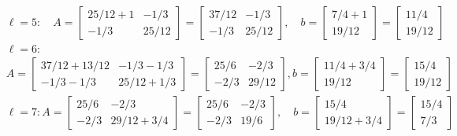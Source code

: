 \documentclass[../main.tex]{subfiles}
\begin{document}
$$
\begin{aligned}
&\ell=5: \quad A=\left[\begin{array}{cc}
25 / 12+1 & -1 / 3 \\
-1 / 3 & 25 / 12
\end{array}\right]=\left[\begin{array}{cc}
37 / 12 & -1 / 3 \\
-1 / 3 & 25 / 12
\end{array}\right], \quad b=\left[\begin{array}{c}
7 / 4+1 \\
19 / 12
\end{array}\right]=\left[\begin{array}{c}
11 / 4 \\
19 / 12
\end{array}\right] \\
&\ell=6: \\
&A=\left[\begin{array}{cc}
37 / 12+13 / 12 & -1 / 3-1 / 3 \\
-1 / 3-1 / 3 & 25 / 12+1 / 3
\end{array}\right]=\left[\begin{array}{cc}
25 / 6 & -2 / 3 \\
-2 / 3 & 29 / 12
\end{array}\right], b=\left[\begin{array}{c}
11 / 4+3 / 4 \\
19 / 12
\end{array}\right]=\left[\begin{array}{c}
15 / 4 \\
19 / 12
\end{array}\right] \\
&\ell=7: A=\left[\begin{array}{cc}
25 / 6 & -2 / 3 \\
-2 / 3 & 29 / 12+3 / 4
\end{array}\right]=\left[\begin{array}{cc}
25 / 6 & -2 / 3 \\
-2 / 3 & 19 / 6
\end{array}\right], \quad b=\left[\begin{array}{c}
15 / 4 \\
19 / 12+3 / 4
\end{array}\right]=\left[\begin{array}{c}
15 / 4 \\
7 / 3
\end{array}\right]
\end{aligned}
$$
\end{document}
